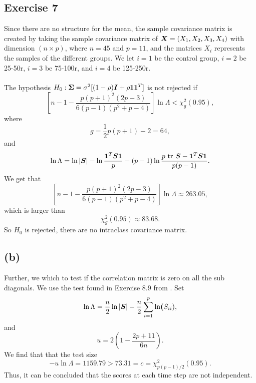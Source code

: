 
\subsection*{Exercise 7}
\label{sec:exercise-7}

Since there are no structure for the mean, the sample covariance matrix
is created by taking the sample covariance matrix of $\bm{X} = (X_{1},
X_{2}, X_{3}, X_{4})$ with dimension $(n \times p)$, where $n = 45$ and
$p= 11$, and the matrices $X_{i}$ represents the samples of the
different groups. We let $i = 1$ be the control group, $i = 2$ be
25-50r, $i = 3$ be 75-100r, and $i = 4$ be  125-250r. \\
\\
The hypothesis $H_{0}: \bm{\Sigma} = \sigma^{2}[(1-\rho)\bm{I} + \rho \bm{1}
\bm{1}^{T}]$ is not rejected if
\begin{equation*}
  \left[ n  - 1 - \frac{p(p+1)^2 (2p-3)}{6(p-1)(p^2+p-4)} \right] \ln
    \Lambda < \chi^{2}_{g}(0.95),
\end{equation*}
where 
\begin{equation*}
  g = \frac{1}{2}p(p+1) -2 = 64,
\end{equation*}
and
\begin{equation*}
 \ln\Lambda = \ln\left| \bm{S} \right|- \ln\frac{\bm{1}^{T} \bm{S} \bm{1}}{p}  - (p-1)\ln\frac{p\text{ tr } \bm{S} - \bm{1}^{T} \bm{S} \bm{1}}{p(p-1)}.
\end{equation*}
We get that
\begin{equation*}
  \left[ n  - 1 - \frac{p(p+1)^2 (2p-3)}{6(p-1)(p^2+p-4)} \right] \ln
    \Lambda \approx 263.05,
\end{equation*}
which is larger than
\begin{equation*}
  \chi^{2}_{g}(0.95) \approx 83.68.
\end{equation*}
So $H_{0}$ is rejected, there are no intraclass covariance matrix.

\subsection*{(b)}
\label{sec:b-6}

Further, we which to test if the correlation matrix is zero on all the
sub diagonals. We use the test found in Exercise 8.9 from \cite[p. 472]{book}. Set 
\begin{equation*}
  \ln \Lambda = \frac n2 \ln |\bm{S} |- \frac n2 \sum_{i = 1}^{p} \ln\bm{(}S_{ii}),
\end{equation*}
and 
\begin{equation*}
  u = 2\left(1 - \frac{2p + 11}{6n}\right).
\end{equation*}
We find that that the test size
\begin{equation*}
  -u \ln \Lambda = 1159.79  > 73.31 = c = \chi^2_{p(p-1)/2}(0.95).
\end{equation*}
Thus, it can be concluded that the scores at each time step are not
independent. 

